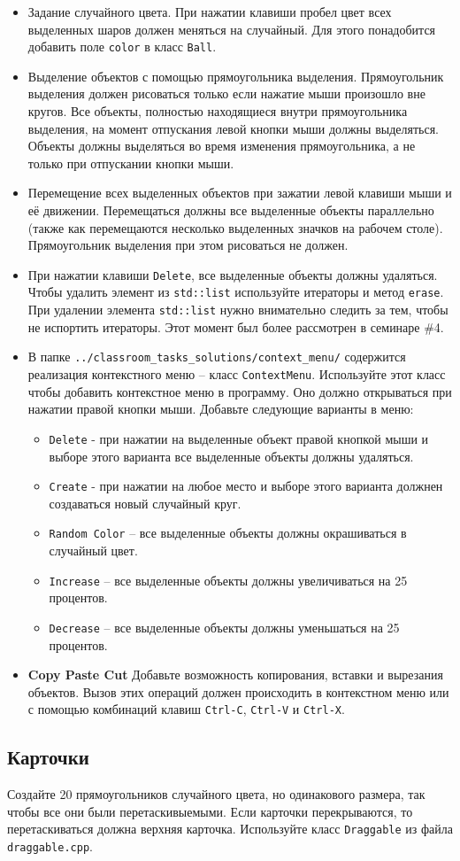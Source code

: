 \documentclass{article}
\begin{document}
\begin{itemize}
\item Задание случайного цвета. При нажатии клавиши пробел цвет всех выделенных шаров должен меняться на случайный. Для этого понадобится добавить поле \texttt{color} в класс \texttt{Ball}.

\item Выделение объектов с помощью прямоугольника выделения. Прямоугольник выделения должен рисоваться только если нажатие мыши произошло вне кругов. Все объекты, полностью находящиеся внутри прямоугольника выделения, на момент отпускания левой кнопки мыши должны выделяться. Объекты должны выделяться во время изменения прямоугольника, а не только при отпускании кнопки мыши.

\item Перемещение всех выделенных объектов при зажатии левой клавиши мыши и её движении. Перемещаться должны все выделенные объекты параллельно (также как перемещаются несколько выделенных значков на рабочем столе). Прямоугольник выделения при этом рисоваться не должен.

\item При нажатии клавиши \texttt{Delete}, все выделенные объекты должны удаляться. Чтобы удалить элемент из \texttt{std::list} используйте итераторы и метод \texttt{erase}. При удалении элемента \texttt{std::list} нужно внимательно следить за тем, чтобы не испортить итераторы. Этот момент был более рассмотрен в семинаре \#4.

\item В папке \texttt{../classroom\_tasks\_solutions/context\_menu/} содержится реализация контекстного меню -- класс \texttt{ContextMenu}. Используйте этот класс чтобы добавить контекстное меню в программу. Оно должно открываться при нажатии правой кнопки мыши. Добавьте следующие варианты в меню:
\begin{itemize}
\item \texttt{Delete} - при нажатии на выделенные объект правой кнопкой мыши и выборе этого варианта все выделенные объекты должны удаляться.
\item \texttt{Create} - при нажатии на любое место и выборе этого варианта должнен создаваться новый случайный круг.
\item \texttt{Random Color} -- все выделенные объекты должны окрашиваться в случайный цвет.
\item \texttt{Increase} -- все выделенные объекты должны увеличиваться на 25 процентов.
\item \texttt{Decrease} -- все выделенные объекты должны уменьшаться на 25 процентов.
\end{itemize}

\item \textbf{Copy Paste Cut} Добавьте возможность копирования, вставки и вырезания объектов. Вызов этих операций должен происходить в контекстном меню или с помощью комбинаций клавиш \texttt{Ctrl-C}, \texttt{Ctrl-V} и \texttt{Ctrl-X}.

\end{itemize}




\subsection{Карточки} 
Создайте 20 прямоугольников случайного цвета, но одинакового размера, так чтобы все они были перетаскивыемыми. Если карточки перекрываются, то перетаскиваться должна верхняя карточка. Используйте класс \texttt{Draggable} из файла \texttt{draggable.cpp}.
	
\end{document}
